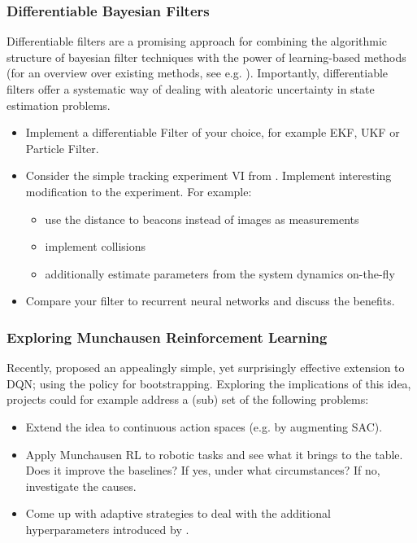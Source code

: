 \documentclass[a4paper]{article}
\begin{document}
\subsubsection{Differentiable Bayesian Filters}
Differentiable filters are a promising approach for combining the algorithmic structure of bayesian filter techniques with the power of learning-based methods (for an overview over existing methods, see e.g. \cite{kloss2021train}). Importantly, differentiable filters offer a systematic way of dealing with aleatoric uncertainty in state estimation problems.
\begin{itemize}
  \item Implement a differentiable Filter of your choice, for example EKF, UKF or Particle Filter.
  \item Consider the simple tracking experiment VI from \cite{kloss2021train}. Implement interesting modification to the experiment. For example:
        \begin{itemize}
          \item use the distance to beacons instead of images as measurements
          \item implement collisions
          \item additionally estimate parameters from the system dynamics on-the-fly
        \end{itemize}
  \item Compare your filter to recurrent neural networks and discuss the benefits.
\end{itemize}

\subsubsection{Exploring Munchausen Reinforcement Learning}
Recently, \cite{vieillard2020munchausen} proposed an appealingly simple, yet surprisingly effective extension to DQN; using the policy for bootstrapping. Exploring the implications of this idea, projects could for example address a (sub) set of the following problems:

\begin{itemize}
  \item Extend the idea to continuous action spaces (e.g. by augmenting SAC).
  \item Apply Munchausen RL to robotic tasks and see what it brings to the table. Does it improve the baselines? If yes, under what circumstances? If no, investigate the causes.
  \item Come up with adaptive strategies to deal with the additional hyperparameters introduced by \cite{vieillard2020munchausen}.
\end{itemize}
\end{document}
